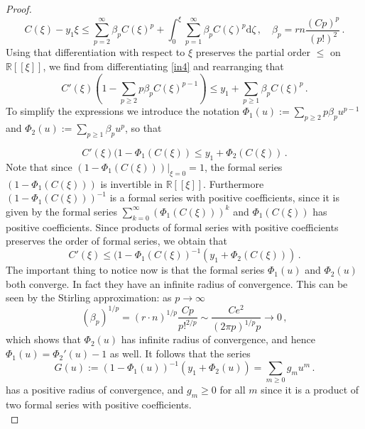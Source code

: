 \documentclass{article}
\theoremstyle{definition}
\numberwithin{equation}{section}
\begin{document}
\begin{proof}
\begin{equation}\label{in4}
    C(\xi)-y_1\xi \leq \sum_{p=2}^{\infty}\beta_pC(\xi)^p+\int_{0}^{\xi}\sum_{p=1}^{\infty}\beta_pC(\zeta)^p\mathrm{d}\zeta\,, \quad \beta_p=rn\frac{(Cp)^p}{(p!)^2}\,.
\end{equation}
Using that differentiation with respect to $\xi$ preserves the partial order $\leq$ on $\mathbb{R}[[\xi]]$, we find from differentiating \eqref{in4} and rearranging that 
\begin{equation*}
    C'(\xi)(1-\sum_{p\geq 2}p\beta_pC(\xi)^{p-1})\leq y_1+\sum_{p\geq 1}\beta_pC(\xi)^p\,.
\end{equation*}
To simplify the expressions we introduce the notation $\Phi_1(u):=\sum_{p\geq 2}p\beta_pu^{p-1}$ and $\Phi_2(u):=\sum_{p \geq 1}\beta_pu^p$, so that 

\begin{equation*}
    C'(\xi)(1-\Phi_1(C(\xi))\leq y_1+\Phi_2(C(\xi))\,.
\end{equation*}
Note that since $(1-\Phi_1(C(\xi)))|_{\xi=0}=1$, the  formal series $(1-\Phi_1(C(\xi)))$ is invertible in $\mathbb{R}[[\xi]].$ Furthermore $(1-\Phi_1(C(\xi)))^{-1}$ is a formal series with positive coefficients, since it is given by the formal series $\sum_{k=0}^{\infty}(\Phi_1(C(\xi)))^k$ and $\Phi_1(C(\xi))$ has positive coefficients. Since products of formal series with positive coefficients preserves the order of formal series, we obtain that 
\begin{equation}\label{in5}
    C'(\xi)\leq(1-\Phi_1(C(\xi))^{-1}(y_1+\Phi_2(C(\xi)))\,.
\end{equation}
The important thing to notice now is that the formal series $\Phi_1(u)$ and $\Phi_2(u)$ both converge. In fact they have an infinite radius of convergence. This can be seen by the Stirling approximation: as $p\to \infty$
\begin{equation}
(\beta_p)^{1/p}=(r\cdot n)^{1/p}\frac{Cp}{p!^{2/p}}\sim \frac{C e^2}{(2\pi p)^{1/p}p}\to 0\,,
\end{equation}
which shows that $\Phi_2(u)$ has infinite radius of convergence, and hence $\Phi_1(u)=\Phi_2'(u)-1$ as well. It follows that the series 
\begin{equation*}
    G(u):=(1-\Phi_1(u))^{-1}(y_1+\Phi_2(u))=\sum_{m\geq 0}g_mu^m\,.
\end{equation*}
has a positive radius of convergence, and $g_m \geq 0$ for all $m$ since it is a product of two formal series with positive coefficients.\\


\end{proof}
\end{document}
